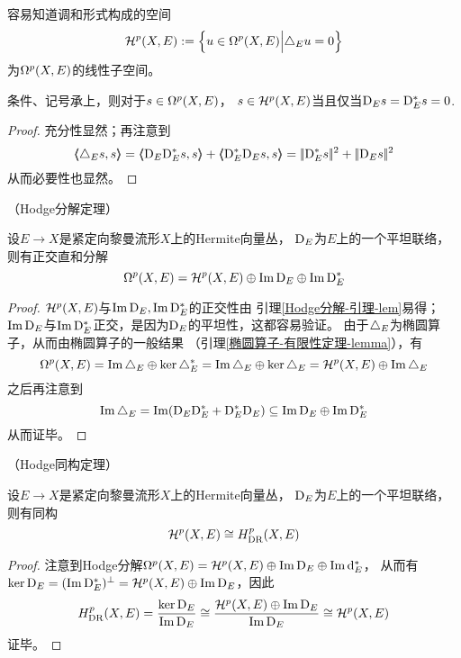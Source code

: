 容易知道调和形式构成的空间
$$
  \mathcal{H}^p(X,E):=\Big\{ u\in\Omega^p(X,E) \Big| \triangle_{E}u=0 \Big\}
$$
为$\Omega^p(X,E)$的线性子空间。

\begin{lemma}\label{Hodge分解-引理-lem}
条件、记号承上，则对于$s\in\Omega^p(X,E)$，
$s\in\mathcal{H}^p(X,E)$当且仅当$\mathrm{D}_E s=\mathrm{D}_{E}^*s=0$.
\end{lemma}

\begin{proof}
充分性显然；再注意到
$$
  \ppair{\yc_E s}{s}
=
  \ppair{\tD_E\tD_E^*s}{s}
+ \ppair{\tD_E^*\tD_Es}{s}
= \norm{\tD_E^*s}^2+\norm{\tD_Es}^2
$$
从而必要性也显然。
\end{proof}

\begin{thm}（Hodge分解定理）
\label{Hodge分解定理-thm}

设$E\to X$是紧定向黎曼流形$X$上的Hermite向量丛，
$\mathrm{D}_E$为$E$上的一个平坦联络，则有正交直和分解
$$
  \Omega^p(X,E)
=
  \mathcal{H}^p(X,E)\oplus\operatorname{Im}\mathrm{D}_E\oplus\operatorname{Im}\mathrm{D}^*_E
$$
\end{thm}

\begin{proof}
$\mathcal{H}^p(X,E)$与$\operatorname{Im}\mathrm{D}_E,\operatorname{Im}\mathrm{D}_E^*$的正交性由
引理\ref{Hodge分解-引理-lem}易得；
$\operatorname{Im}\mathrm{D}_E$与$\operatorname{Im}\mathrm{D}_E^*$正交，是因为$\mathrm{D}_E$的平坦性，这都容易验证。
由于$\triangle_E$为椭圆算子，从而由椭圆算子的一般结果
（引理\ref{椭圆算子-有限性定理-lemma}），有
$$
  \Omega^p(X,E)=\operatorname{Im}\triangle_E\oplus\ker\triangle_E^*
  =\operatorname{Im}\triangle_E\oplus\ker\triangle_E
  =\mathcal{H}^p(X,E)\oplus\operatorname{Im}\triangle_E
$$
之后再注意到
$$
  \operatorname{Im}\triangle_E
=
  \operatorname{Im}(\mathrm{D}_E\mathrm{D}_E^*+\mathrm{D}_E^*\mathrm{D}_E)
\subseteq
  \operatorname{Im}\mathrm{D}_E\oplus\operatorname{Im}\mathrm{D}_E^*
$$
从而证毕。
\end{proof}

\begin{thm}（Hodge同构定理）
\label{Hodge同构定理-thm}

设$E\to X$是紧定向黎曼流形$X$上的Hermite向量丛，
$\mathrm{D}_E$为$E$上的一个平坦联络，则有同构
$$\mathcal{H}^p(X,E)\cong H^p_{\operatorname{DR}}(X,E)$$
\end{thm}

\begin{proof}
注意到Hodge分解$\Omega^p(X,E)=\mathcal{H}^p(X,E)\oplus\operatorname{Im}\mathrm{D}_E\oplus\operatorname{Im}\mathrm{d}_E^*$，
从而有$\ker\mathrm{D}_E=(\operatorname{Im}\mathrm{D}_E^*)^{\bot}=\mathcal{H}^p(X,E)\oplus\operatorname{Im}\mathrm{D}_E$，因此
$$
  H^p_{\operatorname{DR}}(X,E)
=
  \frac{\ker\mathrm{D}_E}{\operatorname{Im}\mathrm{D}_E}
\cong
  \frac{\mathcal{H}^p(X,E)\oplus\operatorname{Im}\mathrm{D}_E}{\operatorname{Im}\mathrm{D}_E}
\cong
  \mathcal{H}^p(X,E)
$$
证毕。
\end{proof}

